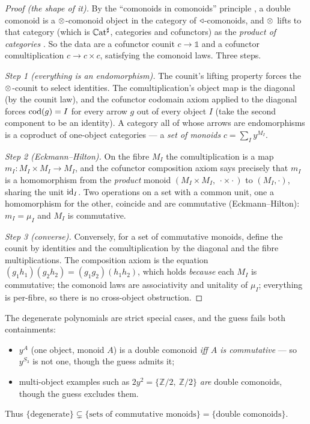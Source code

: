 \begin{proof}[Proof (the shape of it)]
By the ``comonoids in comonoids'' principle \cite{AguiarMahajan}, a double
comonoid is a $\mathbin{\otimes}$-comonoid object in the category of $\mathbin{\triangleleft}$-comonoids, and
$\mathbin{\otimes}$ lifts to that category (which is $\mathbb{C}\mathrm{at}^{\sharp}$, categories and cofunctors) as
the \emph{product of categories} \cite[Prop.~8.79]{NiuSpivak}. So the data are a
cofunctor counit $c\to\mathbb 1$ and a cofunctor comultiplication $c\to c\times
c$, satisfying the comonoid laws. Three steps.

\emph{Step 1 (everything is an endomorphism).} The counit's lifting property
forces the $\mathbin{\otimes}$-counit to select identities. The comultiplication's object map
is the diagonal (by the counit law), and the cofunctor codomain axiom applied to
the diagonal forces $\mathrm{cod}(g)=I$ for every arrow $g$ out of every object $I$
(take the second component to be an identity). A category all of whose arrows are
endomorphisms is a coproduct of one-object categories --- a \emph{set of monoids}
$c=\sum_I y^{M_I}$.

\emph{Step 2 (Eckmann--Hilton).} On the fibre $M_I$ the comultiplication is a map
$m_I\colon M_I\times M_I\to M_I$, and the cofunctor composition axiom says
precisely that $m_I$ is a homomorphism from the \emph{product} monoid
$(M_I\times M_I,\ \cdot\times\cdot)$ to $(M_I,\cdot)$, sharing the unit
$\mathrm{id}_I$. Two operations on a set with a common unit, one a homomorphism for the
other, coincide and are commutative (Eckmann--Hilton): $m_I=\mu_I$ and $M_I$ is
commutative.

\emph{Step 3 (converse).} Conversely, for a set of commutative monoids, define
the counit by identities and the comultiplication by the diagonal and the fibre
multiplications. The composition axiom is the equation
$(g_1h_1)(g_2h_2)=(g_1g_2)(h_1h_2)$, which holds \emph{because} each $M_I$ is
commutative; the comonoid laws are associativity and unitality of $\mu_I$;
everything is per-fibre, so there is no cross-object obstruction.
\end{proof}

\begin{Corollary}\label{cor:corrected}
The degenerate polynomials are strict special cases, and the guess fails both
containments:
\begin{itemize}[nosep]
\item $y^A$ (one object, monoid $A$) is a double comonoid \emph{iff $A$ is
  commutative} --- so $y^{S_3}$ is not one, though the guess admits it;
\item multi-object examples such as $2y^2=\{\mathbb Z/2,\ \mathbb Z/2\}$ \emph{are}
  double comonoids, though the guess excludes them.
\end{itemize}
Thus $\{\text{degenerate}\}\subsetneq\{\text{sets of commutative monoids}\}
=\{\text{double comonoids}\}$.
\end{Corollary}


